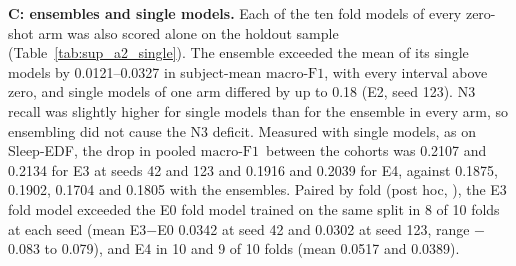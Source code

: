\documentclass[10pt,a4paper]{article}
\newcommand{\mf}{\ensuremath{\mathrm{macro\text{-}F1}}}
\begin{document}
\textbf{C: ensembles and single models.} Each of the ten fold models of every zero-shot arm was also
scored alone on the holdout sample (Table~\ref{tab:sup_a2_single}). The ensemble exceeded the mean of its
single models by 0.0121--0.0327 in subject-mean \mf, with every interval above zero, and single models
of one arm differed by up to 0.18 (E2, seed 123). N3 recall was slightly higher for single models than
for the ensemble in every arm, so ensembling did not cause the N3 deficit. Measured with single models,
as on Sleep-EDF, the drop in pooled \mf\ between the cohorts was 0.2107 and 0.2134 for E3 at seeds 42 and
123 and 0.1916 and 0.2039 for E4, against 0.1875, 0.1902, 0.1704 and 0.1805 with the ensembles.
Paired by fold (post hoc, ), the E3 fold model exceeded the E0
fold model trained on the same split in 8 of 10 folds at each seed (mean E3$-$E0 0.0342 at seed 42 and
0.0302 at seed 123, range $-$0.083 to 0.079), and E4 in 10 and 9 of 10 folds (mean 0.0517 and 0.0389).
\end{document}
